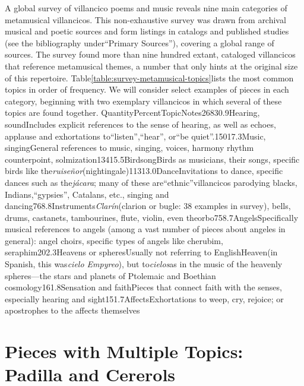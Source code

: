 \documentclass{memoir}
\begin{document}
A global survey of villancico poems and music reveals nine main categories of metamusical villancicos. This non-exhaustive survey was drawn from archival musical and poetic sources and form listings in catalogs and published studies (see the bibliography under\enquote{Primary Sources}), covering a global range of sources. The survey found more than nine hundred extant, cataloged villancicos that reference metamusical themes, a number that only hints at the original size of this repertoire. Table\ref{table:survey-metamusical-topics}lists the most common topics in order of frequency. We will consider select examples of pieces in each category, beginning with two exemplary villancicos in which several of these topics are found together.
QuantityPercentTopicNotes26830.9Hearing, soundIncludes explicit references to the sense of hearing, as well as echoes, applause and exhortations to\enquote{listen},\enquote{hear}, or\enquote{be quiet}.15017.3Music, singingGeneral references to music, singing, voices, harmony rhythm counterpoint, solmization13415.5BirdsongBirds as musicians, their songs, specific birds like the\emph{ruiseñor}(nightingale)11313.0DanceInvitations to dance, specific dances such as the\emph{jácara}; many of these are\enquote{ethnic}villancicos parodying blacks, Indians,\enquote{gypsies}, Catalans, etc., singing and dancing768.8Instruments\emph{Clarín}(clarion or bugle: 38 examples in survey), bells, drums, castanets, tambourines, flute, violin, even theorbo758.7AngelsSpecifically musical references to angels (among a vast number of pieces about angeles in general): angel choirs, specific types of angels like cherubim, seraphim202.3Heavens or spheresUsually not referring to EnglishHeaven(in Spanish, this was\emph{cielo Empyreo}), but to\emph{cielos}as in the music of the heavenly spheres—the stars and planets of Ptolemaic and Boethian cosmology161.8Sensation and faithPieces that connect faith with the senses, especially hearing and sight151.7AffectsExhortations to weep, cry, rejoice; or apostrophes to the affects themselves
\section{Pieces with Multiple Topics: Padilla and Cererols}
    
\label{ch1:multiple-topics}
\end{document}
